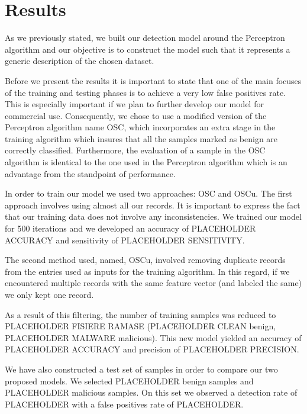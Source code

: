 \section{Results}
\par
As we previously stated, we built our detection model around the Perceptron algorithm and our objective is to construct the model such that it represents a generic description of the chosen dataset.
\par
Before we present the results it is important to state that one of the main focuses of the training and testing phases is to achieve a very low false positives rate. This is especially important if we plan to further develop our model for commercial use. Consequently, we chose to use a modified version of the Perceptron algorithm name OSC, which incorporates an extra stage in the training algorithm which insures that all the samples marked as benign are correctly classified. Furthermore, the evaluation of a sample in the OSC algorithm is identical to the one used in the Perceptron algorithm which is an advantage from the standpoint of performance.
\par
In order to train our model we used two approaches: OSC and OSCu. The first approach involves using almost all our records. It is important to express the fact that our training data does not involve any inconsistencies. We trained our model for 500 iterations and we developed an accuracy of PLACEHOLDER ACCURACY and sensitivity of PLACEHOLDER SENSITIVITY. 
\par
The second method used, named, OSCu,  involved removing duplicate records from the entries used as inputs for the training algorithm. In this regard, if we encountered multiple records with the same feature vector (and labeled the same) we only kept one record.
\par
As a result of this filtering, the number of training samples was reduced to PLACEHOLDER FISIERE RAMASE (PLACEHOLDER CLEAN benign, PLACEHOLDER MALWARE malicious). This new model yielded an accuracy of PLACEHOLDER ACCURACY and precision of PLACEHOLDER PRECISION.
\par
We have also constructed a test set of samples in order to compare our two proposed models. We selected PLACEHOLDER benign samples and PLACEHOLDER malicious samples. On this set we observed a detection rate of PLACEHOLDER with a false positives rate of PLACEHOLDER.
